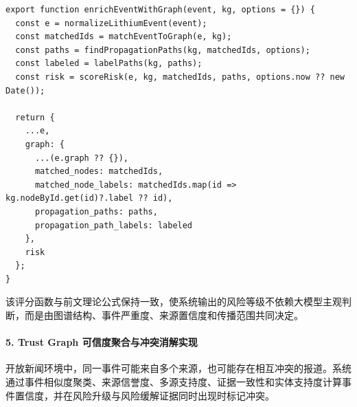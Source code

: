 \documentclass[12pt,a4paper]{article}
\begin{document}
\begin{lstlisting}[style=projectcode,caption={图增强可解释风险评分实现}]
export function enrichEventWithGraph(event, kg, options = {}) {
  const e = normalizeLithiumEvent(event);
  const matchedIds = matchEventToGraph(e, kg);
  const paths = findPropagationPaths(kg, matchedIds, options);
  const labeled = labelPaths(kg, paths);
  const risk = scoreRisk(e, kg, matchedIds, paths, options.now ?? new Date());

  return {
    ...e,
    graph: {
      ...(e.graph ?? {}),
      matched_nodes: matchedIds,
      matched_node_labels: matchedIds.map(id => kg.nodeById.get(id)?.label ?? id),
      propagation_paths: paths,
      propagation_path_labels: labeled
    },
    risk
  };
}
\end{lstlisting}

该评分函数与前文理论公式保持一致，使系统输出的风险等级不依赖大模型主观判断，而是由图谱结构、事件严重度、来源置信度和传播范围共同决定。

\paragraph{5. Trust Graph 可信度聚合与冲突消解实现}

开放新闻环境中，同一事件可能来自多个来源，也可能存在相互冲突的报道。系统通过事件相似度聚类、来源信誉度、多源支持度、证据一致性和实体支持度计算事件置信度，并在风险升级与风险缓解证据同时出现时标记冲突。
\end{document}
